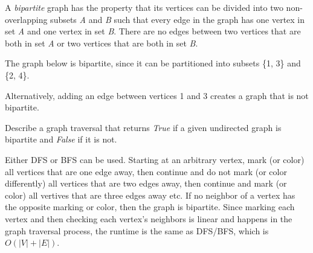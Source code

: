 \begin{blocksection}
\question A \textit{bipartite} graph has the property that its vertices can be divided into two non-overlapping subsets \textit{A} and \textit{B} such that every edge in the graph has one vertex in set \textit{A} and one vertex in set \textit{B}. There are no edges between two vertices that are both in set \textit{A} or two vertices that are both in set \textit{B}.

The graph below is bipartite, since it can be partitioned into subsets \{1, 3\} and \{2, 4\}.
\begin{center}
\end{center}

Alternatively, adding an edge between vertices 1 and 3 creates a graph that is not bipartite.
\begin{center}
\end{center}

Describe a graph traversal that returns \textit{True} if a given undirected graph is bipartite and \textit{False} if it is not.

\begin{solution}
Either DFS or BFS can be used. Starting at an arbitrary vertex, mark (or color) all vertices that are one edge away, then continue and do not mark (or color differently) all vertices that are two edges away, then continue and mark (or color) all vertives that are three edges away etc. If no neighbor of a vertex has the opposite marking or color, then the graph is bipartite.
Since marking each vertex and then checking each vertex's neighbors is linear and happens in the graph traversal process, the runtime is the same as DFS/BFS, which is $O(|V| + |E|)$.
\end{solution}
\end{blocksection}